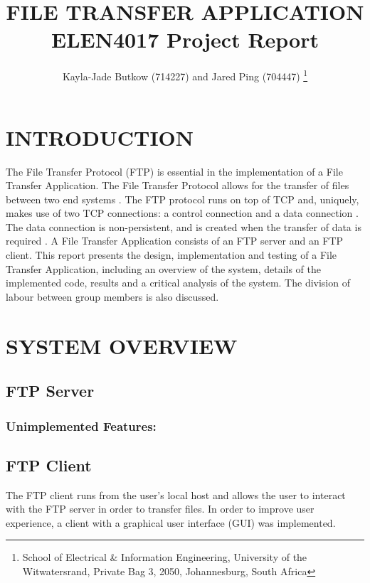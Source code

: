 \documentclass[10pt,twocolumn]{witseiepaper}
\begin{document}
\title{FILE TRANSFER APPLICATION  \\ ELEN4017 Project Report}

\author{Kayla-Jade Butkow (714227) and Jared Ping (704447)
\thanks{School of Electrical \& Information Engineering, University of the
Witwatersrand, Private Bag 3, 2050, Johannesburg, South Africa}
}


%
\abstract{}


\maketitle
\thispagestyle{empty}
\pagestyle{plain}
\setcounter{page}{1}

%
\section{INTRODUCTION}
The File Transfer Protocol (FTP) is essential in the implementation of a File Transfer Application. The File Transfer Protocol allows for the transfer of files between two end systems \cite{kurose}. The FTP protocol runs on top of TCP and, uniquely, makes use of two TCP connections: a control connection and a data connection \cite{kurose}. The data connection is non-persistent, and is created when the transfer of data is required \cite{kurose}. A File Transfer Application consists of an FTP server and an FTP client. This report presents the design, implementation and testing of a File Transfer Application, including an overview of the system, details of the implemented code, results and a critical analysis of the system. The division of labour between group members is also discussed.

\section{SYSTEM OVERVIEW}
\subsection{FTP Server}
\subsubsection*{Unimplemented Features:}

\subsection{FTP Client}
The FTP client runs from the user's local host and allows the user to interact with the FTP server in order to transfer files. In order to improve user experience, a client with a graphical user interface (GUI) was implemented. 
\end{document}
